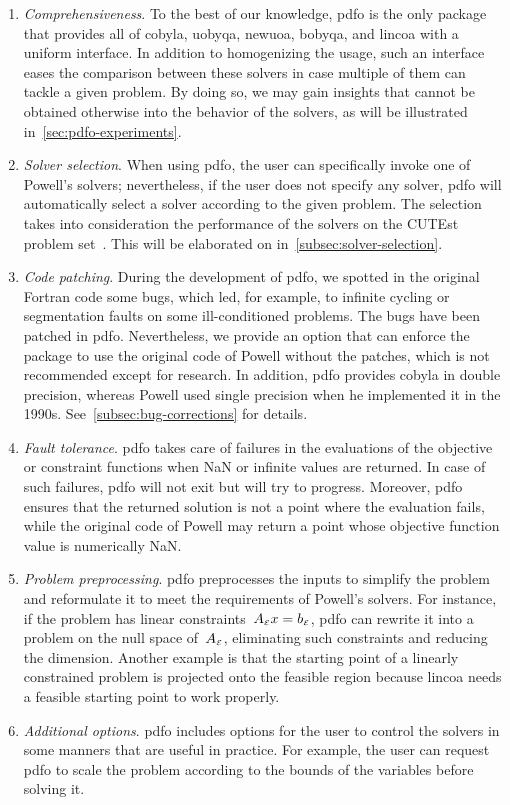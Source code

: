\begin{enumerate}
    \item \emph{Comprehensiveness}.
    To the best of our knowledge, \gls{pdfo} is the only package that provides all of \gls{cobyla}, \gls{uobyqa}, \gls{newuoa}, \gls{bobyqa}, and \gls{lincoa} with a uniform interface.
    In addition to homogenizing the usage, such an interface eases the comparison between these solvers in case multiple of them can tackle a given problem.
    By doing so, we may gain insights that cannot be obtained otherwise into the behavior of the solvers, as will be illustrated in~\cref{sec:pdfo-experiments}.
    \item \emph{Solver selection}.
    When using \gls{pdfo}, the user can specifically invoke one of Powell's solvers; nevertheless, if the user does not specify any solver, \gls{pdfo} will automatically select a solver according to the given problem.
    The selection takes into consideration the performance of the solvers on the CUTEst problem set~\cite{Gould_Orban_Toint_2015}.
    This will be elaborated on in~\cref{subsec:solver-selection}.
    \item \emph{Code patching}.
    During the development of \gls{pdfo}, we spotted in the original Fortran code some bugs, which led, for example, to infinite cycling or segmentation faults on some ill-conditioned problems.
    The bugs have been patched in \gls{pdfo}.
    Nevertheless, we provide an option that can enforce the package to use the original code of Powell without the patches, which is not recommended except for research.
    In addition, \gls{pdfo} provides \gls{cobyla} in double precision, whereas Powell used single precision when he implemented it in the 1990s.
    See~\cref{subsec:bug-corrections} for details.
    \item \emph{Fault tolerance}.
    \Gls{pdfo} takes care of failures in the evaluations of the objective or constraint functions when NaN or infinite values are returned.
    In case of such failures, \gls{pdfo} will not exit but will try to progress.
    Moreover, \gls{pdfo} ensures that the returned solution is not a point where the evaluation fails, while the original code of Powell may return a point whose objective function value is numerically NaN.
    \item \emph{Problem preprocessing}.
    \gls{pdfo} preprocesses the inputs to simplify the problem and reformulate it to meet the requirements of Powell's solvers.
    For instance, if the problem has linear constraints~$A_{\scriptscriptstyle\ieq} \iter = b_{\scriptscriptstyle\ieq}$, \gls{pdfo} can rewrite it into a problem on the null space of~$A_{\scriptscriptstyle\mathcal{E}}$, eliminating such constraints and reducing the dimension.
    Another example is that the starting point of a linearly constrained problem is projected onto the feasible region because \gls{lincoa} needs a feasible starting point to work properly.
    \item \emph{Additional options}.
    \gls{pdfo} includes options for the user to control the solvers in some manners that are useful in practice.
    For example, the user can request \gls{pdfo} to scale the problem according to the bounds of the variables before solving it.
\end{enumerate}

